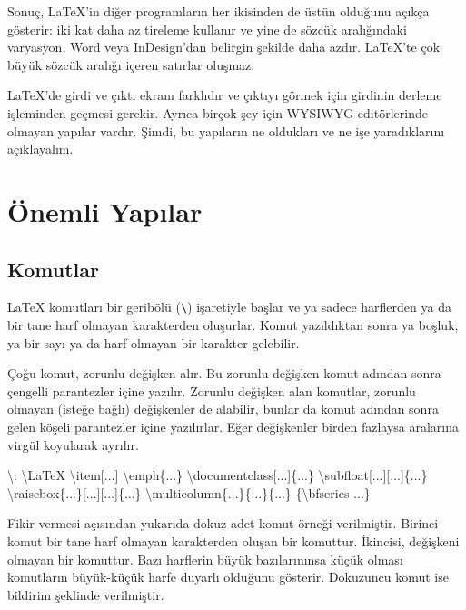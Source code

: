 \documentclass[
  10pt,
]{scrbook}
\newenvironment{Shaded}{\begin{snugshade}}{\end{snugshade}}
\newcommand{\NormalTok}[1]{#1}
\newcommand{\SpecialCharTok}[1]{\textcolor[rgb]{0.00,0.00,0.00}{#1}}
\begin{document}
Sonuç, LaTeX'in diğer programların her ikisinden de üstün olduğunu
açıkça gösterir: iki kat daha az tireleme kullanır ve yine de sözcük
aralığındaki varyasyon, Word veya InDesign'dan belirgin şekilde daha
azdır. LaTeX'te çok büyük sözcük aralığı içeren satırlar oluşmaz.

LaTeX'de girdi ve çıktı ekranı farklıdır ve
çıktıyı görmek için girdinin derleme işleminden geçmesi gerekir. Ayrıca
birçok şey için WYSIWYG editörlerinde olmayan yapılar vardır. Şimdi, bu
yapıların ne oldukları ve ne işe yaradıklarını açıklayalım.

\hypertarget{uxf6nemli-yapux131lar}{%
\section{Önemli Yapılar}\label{uxf6nemli-yapux131lar}}

\hypertarget{komutlar}{%
\subsection{Komutlar}\label{komutlar}}

LaTeX komutları bir geribölü (\texttt{\textbackslash{}}) işaretiyle başlar ve ya sadece
harflerden ya da bir tane harf olmayan karakterden oluşurlar. Komut
yazıldıktan sonra ya boşluk, ya bir sayı ya da harf olmayan bir karakter
gelebilir.

Çoğu komut, zorunlu değişken alır. Bu zorunlu değişken komut adından
sonra çengelli parantezler içine yazılır. Zorunlu değişken alan
komutlar, zorunlu olmayan (isteğe bağlı) değişkenler de alabilir, bunlar
da komut adından sonra gelen köşeli parantezler içine yazılırlar. Eğer
değişkenler birden fazlaysa aralarına virgül koyularak ayrılır.

\begin{Shaded}
\begin{Highlighting}[numbers=left,,]
\NormalTok{\textbackslash{}}\SpecialCharTok{:}
\NormalTok{\textbackslash{}LaTeX}
\NormalTok{\textbackslash{}item[...]}
\NormalTok{\textbackslash{}emph\{...\}}
\NormalTok{\textbackslash{}documentclass[...]\{...\}}
\NormalTok{\textbackslash{}subfloat[...][...]\{...\}}
\NormalTok{\textbackslash{}raisebox\{...\}[...][...]\{...\}}
\NormalTok{\textbackslash{}multicolumn\{...\}\{...\}\{...\}}
\NormalTok{\{\textbackslash{}bfseries ...\}}
\end{Highlighting}
\end{Shaded}

Fikir vermesi açısından yukarıda dokuz adet komut örneği verilmiştir.
Birinci komut bir tane harf olmayan karakterden oluşan bir komuttur.
İkincisi, değişkeni olmayan bir komuttur. Bazı harflerin büyük
bazılarınınsa küçük olması komutların büyük-küçük harfe duyarlı olduğunu
gösterir. Dokuzuncu komut ise bildirim şeklinde verilmiştir.
\end{document}
